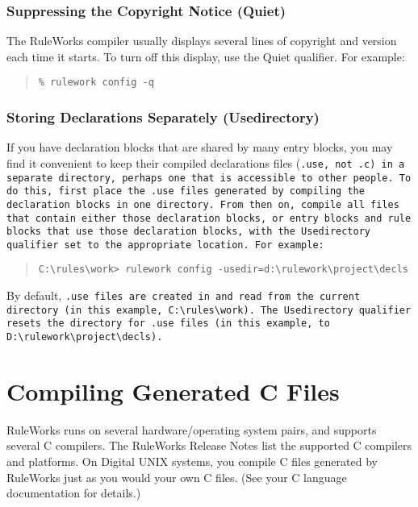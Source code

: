 \subsubsection{Suppressing the Copyright Notice (Quiet)}

The RuleWorks compiler usually displays several lines of copyright and
version each time it starts. To turn off this display, use the Quiet
qualifier. For example:

\begin{quote}
\begin{verbatim}
% rulework config -q
\end{verbatim}
\end{quote}

\subsubsection{Storing Declarations Separately (Usedirectory)}

If you have declaration blocks that are shared by many entry blocks,
you may find it convenient to keep their compiled declarations files
(\tt{.use}, not \tt{.c}) in a separate directory, perhaps one that is
accessible to other people. To do this, first place the \tt{.use}
files generated by compiling the declaration blocks in one directory.
From then on, compile all files that contain either those declaration
blocks, or entry blocks and rule blocks that use those declaration
blocks, with the Usedirectory qualifier set to the appropriate
location. For example:

\begin{quote}
\begin{verbatim}
C:\rules\work> rulework config -usedir=d:\rulework\project\decls
\end{verbatim}
\end{quote}

By default, \tt{.use} files are created in and read from the current
directory (in this example, \verb|C:\rules\work|). The Usedirectory
qualifier resets the directory for \tt{.use} files (in this example,
to \verb|D:\rulework\project\decls|).

\section{Compiling Generated C Files}

RuleWorks runs on several hardware/operating system pairs, and
supports several C compilers. The RuleWorks Release Notes list the
supported C compilers and platforms. On Digital UNIX systems, you
compile C files generated by RuleWorks just as you would your own C
files. (See your C language documentation for details.)

